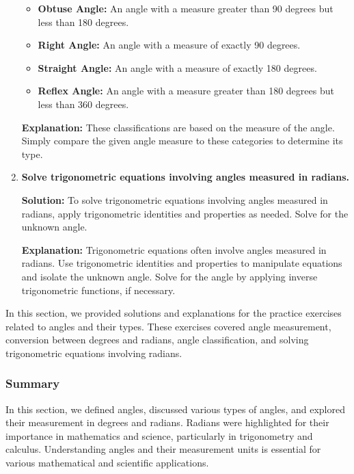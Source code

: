 \documentclass[a4paper,12pt]{book}
\begin{document}
\begin{enumerate}
\begin{itemize}
        \item \textbf{Obtuse Angle:} An angle with a measure greater than 90 degrees but less than 180 degrees.
        
        \item \textbf{Right Angle:} An angle with a measure of exactly 90 degrees.
        
        \item \textbf{Straight Angle:} An angle with a measure of exactly 180 degrees.
        
        \item \textbf{Reflex Angle:} An angle with a measure greater than 180 degrees but less than 360 degrees.
    \end{itemize}
    
    \textbf{Explanation:} These classifications are based on the measure of the angle. Simply compare the given angle measure to these categories to determine its type.
    
    \item \textbf{Solve trigonometric equations involving angles measured in radians.}
    
    \textbf{Solution:} To solve trigonometric equations involving angles measured in radians, apply trigonometric identities and properties as needed. Solve for the unknown angle.
    
    \textbf{Explanation:} Trigonometric equations often involve angles measured in radians. Use trigonometric identities and properties to manipulate equations and isolate the unknown angle. Solve for the angle by applying inverse trigonometric functions, if necessary.
    
\end{enumerate}

In this section, we provided solutions and explanations for the practice exercises related to angles and their types. These exercises covered angle measurement, conversion between degrees and radians, angle classification, and solving trigonometric equations involving radians.

\subsubsection*{Summary}

In this section, we defined angles, discussed various types of angles, and explored their measurement in degrees and radians. Radians were highlighted for their importance in mathematics and science, particularly in trigonometry and calculus. Understanding angles and their measurement units is essential for various mathematical and scientific applications.
\end{document}
